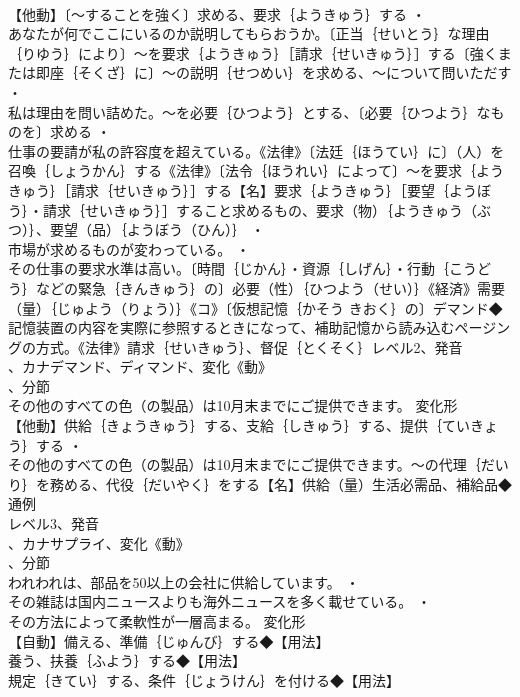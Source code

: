 \documentclass[8pt]{extreport}
\begin{document}
\begin{CJK}{UTF8}{min}
\\	【他動】〔～することを強く〕求める、要求｛ようきゅう｝する ・
\\	あなたが何でここにいるのか説明してもらおうか。〔正当｛せいとう｝な理由｛りゆう｝により〕～を要求｛ようきゅう｝［請求｛せいきゅう｝］する〔強くまたは即座｛そくざ｝に〕～の説明｛せつめい｝を求める、～について問いただす ・
\\	私は理由を問い詰めた。～を必要｛ひつよう｝とする、〔必要｛ひつよう｝なものを〕求める ・
\\	仕事の要請が私の許容度を超えている。《法律》〔法廷｛ほうてい｝に〕（人）を召喚｛しょうかん｝する《法律》〔法令｛ほうれい｝によって〕～を要求｛ようきゅう｝［請求｛せいきゅう｝］する【名】要求｛ようきゅう｝［要望｛ようぼう｝・請求｛せいきゅう｝］すること求めるもの、要求（物）｛ようきゅう（ぶつ）｝、要望（品）｛ようぼう（ひん）｝ ・
\\	市場が求めるものが変わっている。 ・
\\	その仕事の要求水準は高い。〔時間｛じかん｝・資源｛しげん｝・行動｛こうどう｝などの緊急｛きんきゅう｝の〕必要（性）｛ひつよう（せい）｝《経済》需要（量）｛じゅよう（りょう）｝《コ》〔仮想記憶｛かそう きおく｝の〕デマンド◆記憶装置の内容を実際に参照するときになって、補助記憶から読み込むページングの方式。《法律》請求｛せいきゅう｝、督促｛とくそく｝レベル2、発音
\\	、カナデマンド、ディマンド、変化《動》
\\	、分節
\\	その他のすべての色（の製品）は10月末までにご提供できます。	変化形 
\\	【他動】供給｛きょうきゅう｝する、支給｛しきゅう｝する、提供｛ていきょう｝する ・
\\	その他のすべての色（の製品）は10月末までにご提供できます。～の代理｛だいり｝を務める、代役｛だいやく｝をする【名】供給（量）生活必需品、補給品◆通例
\\	レベル3、発音
\\	、カナサプライ、変化《動》
\\	、分節
\\	われわれは、部品を50以上の会社に供給しています。 ・
\\	その雑誌は国内ニュースよりも海外ニュースを多く載せている。 ・
\\	その方法によって柔軟性が一層高まる。	変化形 
\\	【自動】備える、準備｛じゅんび｝する◆【用法】
\\	養う、扶養｛ふよう｝する◆【用法】
\\	規定｛きてい｝する、条件｛じょうけん｝を付ける◆【用法】

\end{CJK}
\end{document}

